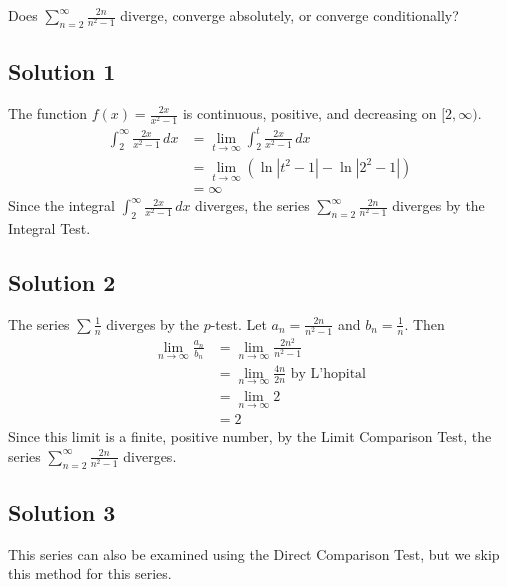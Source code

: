 \documentclass{article}
\begin{document}
\noindent
Does $\displaystyle \sum_{n=2}^\infty \frac{2n}{n^2-1}$
diverge, converge absolutely, or converge conditionally?

\subsection*{Solution 1}

The function $f(x)=\frac{2x}{x^2-1}$ is continuous, positive, and decreasing on $[2,\infty)$.
\begin{align*}
\int_2^\infty \frac{2x}{x^2-1}\,dx
&= \lim_{t \to \infty} \int_2^t \frac{2x}{x^2-1}\,dx\\
&= \lim_{t \to \infty} (\ln|t^2-1| - \ln |2^2-1|)\\
&= \infty
\end{align*}
Since the integral $\displaystyle \int_2^\infty \frac{2x}{x^2-1}\,dx$ diverges, the series $\displaystyle \sum_{n=2}^\infty \frac{2n}{n^2-1}$ diverges by the Integral Test.

\subsection*{Solution 2}

The series $\sum \frac1{n}$ diverges by the $p$-test. Let $a_n = \frac{2n}{n^2-1}$ and $b_n=\frac1{n}$. Then
\begin{align*}
\lim_{n \to \infty} \frac{a_n}{b_n}
&= \lim_{n \to \infty} \frac{2n^2}{n^2-1}\\
&= \lim_{n \to \infty} \frac{4n}{2n} \text{ by L'hopital}\\
&= \lim_{n \to \infty} 2 \\
&= 2
\end{align*}
Since this limit is a finite, positive number, by the Limit Comparison Test, the series $\displaystyle \sum_{n=2}^\infty \frac{2n}{n^2-1}$ diverges.

\subsection*{Solution 3}

This series can also be examined using the Direct Comparison Test, but we skip this method for this series.
\end{document}
